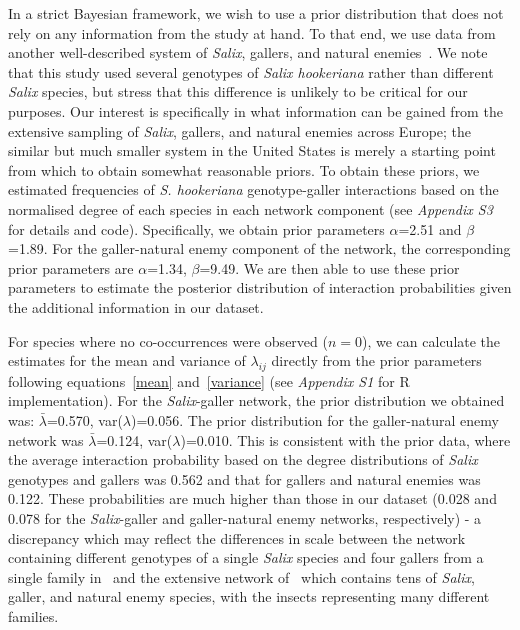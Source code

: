 \documentclass[12pt]{article}
\begin{document}
\begin{spacing}{2.0}
      In a strict Bayesian framework, we wish to use a prior distribution that does not rely on any information from the study at hand. To that end, we use data from another well-described system of \emph{Salix}, gallers, and natural enemies~\citep{Barbour2016,Barbour2016Dryad}. We note that this study used several genotypes of \emph{Salix hookeriana} rather than different \emph{Salix} species, but stress that this difference is unlikely to be critical for our purposes. Our interest is specifically in what information can be gained from the extensive sampling of \emph{Salix}, gallers, and natural enemies across Europe; the similar but much smaller system in the United States is merely a starting point from which to obtain somewhat reasonable priors. To obtain these priors, we estimated frequencies of  \emph{S. hookeriana} genotype-galler interactions based on the normalised degree of each species in each network component (see \emph{Appendix S3} for details and code). Specifically, we obtain prior parameters $\alpha$=2.51 and $\beta$=1.89. For the galler-natural enemy component of the network, the corresponding prior parameters are $\alpha$=1.34, $\beta$=9.49. We are then able to use these prior parameters to estimate the posterior distribution of interaction probabilities given the additional information in our dataset.
  

      For species where no co-occurrences were observed ($n=0$), we can calculate the estimates for the mean and variance of $\lambda_{ij}$ directly from the prior parameters following equations~\ref{mean} and~\ref{variance} (see \emph{Appendix S1} for R implementation). For the \emph{Salix}-galler network, the prior distribution we obtained was: $\bar\lambda$=0.570, var($\lambda$)=0.056. The prior distribution for the galler-natural enemy network was $\bar\lambda$=0.124, var($\lambda$)=0.010. This is consistent with the prior data, where the average interaction probability based on the degree distributions of \emph{Salix} genotypes and gallers was 0.562 and that for gallers and natural enemies was 0.122. These probabilities are much higher than those in our dataset (0.028 and 0.078 for the \emph{Salix}-galler and galler-natural enemy networks, respectively) - a discrepancy which may reflect the differences in scale between the network containing different genotypes of a single \emph{Salix} species and four gallers from a single family in~\citet{Barbour2016} and the extensive network of~\citet{Kopelke2017} which contains tens of \emph{Salix}, galler, and natural enemy species, with the insects representing many different families.



\end{spacing}
\end{document}
